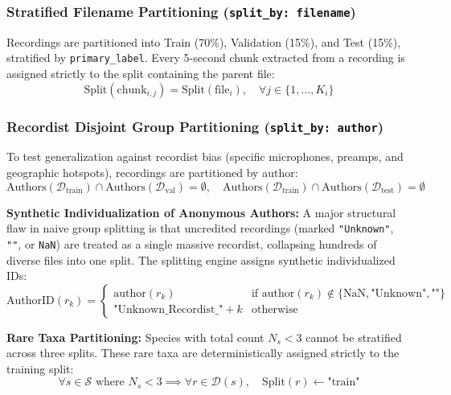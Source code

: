 \documentclass[11pt,a4paper]{article}
\begin{document}
\subsubsection{Stratified Filename Partitioning (\texttt{split\_by: filename})}
Recordings are partitioned into Train (70\%), Validation (15\%), and Test (15\%), stratified by \texttt{primary\_label}. Every 5-second chunk extracted from a recording is assigned strictly to the split containing the parent file:
\begin{equation}
    \text{Split}(\text{chunk}_{i, j}) = \text{Split}(\text{file}_i), \quad \forall j \in \{1, \dots, K_i\}
\end{equation}

\subsubsection{Recordist Disjoint Group Partitioning (\texttt{split\_by: author})}
To test generalization against recordist bias (specific microphones, preamps, and geographic hotspots), recordings are partitioned by author:
\begin{equation}
    \text{Authors}(\mathcal{D}_{\text{train}}) \cap \text{Authors}(\mathcal{D}_{\text{val}}) = \emptyset, \quad \text{Authors}(\mathcal{D}_{\text{train}}) \cap \text{Authors}(\mathcal{D}_{\text{test}}) = \emptyset
\end{equation}

\noindent \textbf{Synthetic Individualization of Anonymous Authors:} A major structural flaw in naive group splitting is that uncredited recordings (marked \texttt{"Unknown"}, \texttt{""}, or \texttt{NaN}) are treated as a single massive recordist, collapsing hundreds of diverse files into one split. The splitting engine assigns synthetic individualized IDs:
\begin{equation}
    \text{AuthorID}(r_k) = \begin{cases}
        \text{author}(r_k) & \text{if } \text{author}(r_k) \notin \{\text{NaN}, \text{"Unknown"}, \text{""}\} \\
        \text{"Unknown\_Recordist\_"} + k & \text{otherwise}
    \end{cases}
\end{equation}

\noindent \textbf{Rare Taxa Partitioning:} Species with total count $N_s < 3$ cannot be stratified across three splits. These rare taxa are deterministically assigned strictly to the training split:
\begin{equation}
    \forall s \in \mathcal{S} \text{ where } N_s < 3 \implies \forall r \in \mathcal{D}(s), \quad \text{Split}(r) \leftarrow \text{"train"}
\end{equation}
\end{document}
